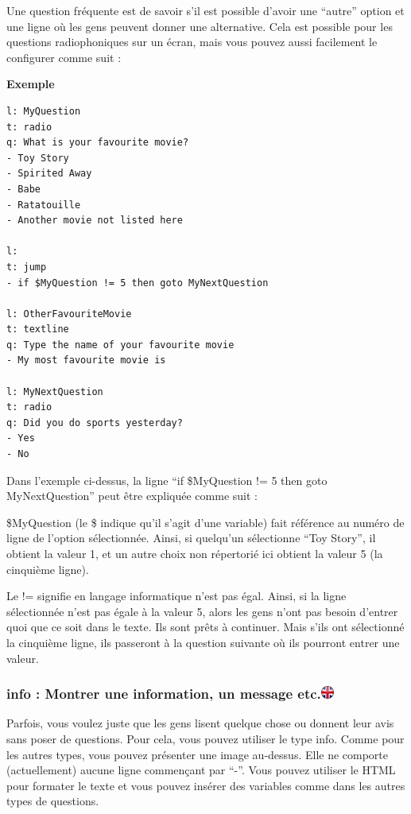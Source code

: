 \documentclass[
]{book}
\begin{document}
Une question fréquente est de savoir s'il est possible d'avoir une ``autre'' option et une ligne où les gens peuvent donner une alternative. Cela est possible pour les questions radiophoniques sur un écran, mais vous pouvez aussi facilement le configurer comme suit :

\textbf{Exemple}

\begin{verbatim}
l: MyQuestion
t: radio
q: What is your favourite movie?
- Toy Story
- Spirited Away
- Babe
- Ratatouille
- Another movie not listed here

l:
t: jump
- if $MyQuestion != 5 then goto MyNextQuestion

l: OtherFavouriteMovie
t: textline
q: Type the name of your favourite movie
- My most favourite movie is

l: MyNextQuestion
t: radio
q: Did you do sports yesterday?
- Yes
- No
\end{verbatim}

Dans l'exemple ci-dessus, la ligne ``if \$MyQuestion != 5 then goto MyNextQuestion'' peut être expliquée comme suit :

\$MyQuestion (le \$ indique qu'il s'agit d'une variable) fait référence au numéro de ligne de l'option sélectionnée. Ainsi, si quelqu'un sélectionne ``Toy Story'', il obtient la valeur 1, et un autre choix non répertorié ici obtient la valeur 5 (la cinquième ligne).

Le != signifie en langage informatique n'est pas égal. Ainsi, si la ligne sélectionnée n'est pas égale à la valeur 5, alors les gens n'ont pas besoin d'entrer quoi que ce soit dans le texte. Ils sont prêts à continuer. Mais s'ils ont sélectionné la cinquième ligne, ils passeront à la question suivante où ils pourront entrer une valeur.

\hypertarget{info-montrer-une-information-un-message-etc.}{%
\subsubsection[info : Montrer une information, un message etc.]{\texorpdfstring{info : Montrer une information, un message etc.\href{https://www.psytoolkit.org/doc3.1.0/online-survey-syntax.html\#info}{\protect\includegraphics{img/ukflag.png}}}{info : Montrer une information, un message etc.}}\label{info-montrer-une-information-un-message-etc.}}

Parfois, vous voulez juste que les gens lisent quelque chose ou donnent leur avis sans poser de questions. Pour cela, vous pouvez utiliser le type info. Comme pour les autres types, vous pouvez présenter une image au-dessus. Elle ne comporte (actuellement) aucune ligne commençant par ``-''. Vous pouvez utiliser le HTML pour formater le texte et vous pouvez insérer des variables comme dans les autres types de questions.
\end{document}
